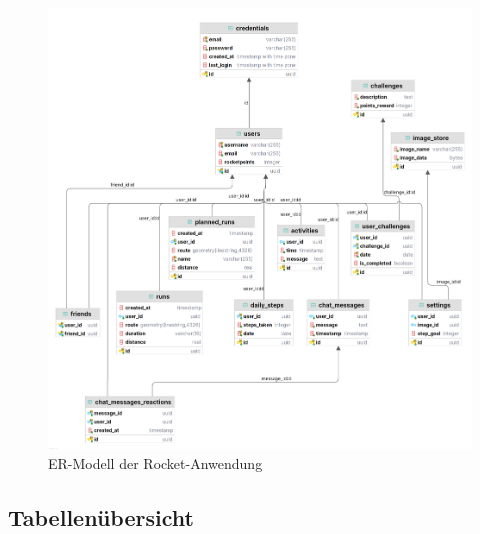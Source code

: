 \documentclass[11pt,a4paper]{article}
\begin{document}
\begin{figure}[H]
    \centering
    \includegraphics[width=0.8\linewidth]{images/RocketERLight.png}
    \caption{ER-Modell der Rocket-Anwendung}
\end{figure}

\subsection*{Tabellenübersicht}
\end{document}
